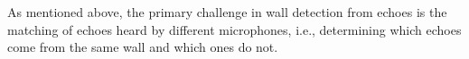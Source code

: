 \documentclass[reqno]{amsart}
\begin{document}
\newcommand{\ve}[1]{\mathbf{#1}}%
\newcommand{\re}{\operatorname{ref}}%
\newcommand{\ini}{{\operatorname{ini}}}%
\newcommand{\Mini}{M_\ini}%
\newcommand{\ASO}{\operatorname{ASO}}%
\newcommand{\h}{{\operatorname{hom}}}
\newcommand{\vertex}[1][black]{\node[#1,circle, draw, outer sep=3pt,
  inner sep=0pt, minimum size=3pt,fill]}

As mentioned above, the primary
challenge in wall detection from echoes is the matching of echoes
heard by different microphones, i.e., determining which echoes come
from the same wall and which ones do not.

\end{document}
